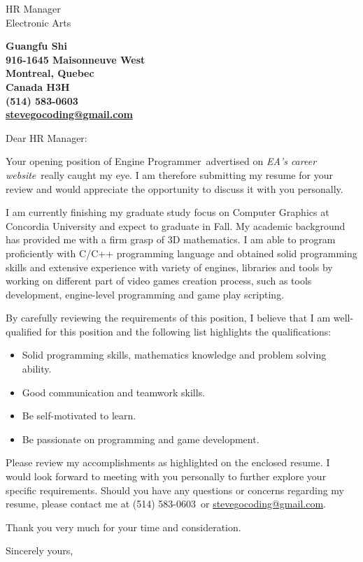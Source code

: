 \documentclass{letter}
\makeatletter
\newcommand{\phcompanyname}             {Electronic Arts}
\newcommand{\clcontactname}         {HR Manager}
\newcommand{\clcompanyname}         {\phcompanyname}
\newcommand{\cljobpostedtitle}      {Engine Programmer}
\newcommand{\cljobpostedplace}      {EA's career website}
\newcommand{\clmyname}              {Guangfu Shi}
\newcommand{\clmyaddr}              {916-1645 Maisonneuve West \\ Montreal, Quebec \\ Canada H3H }
\newcommand{\clmyemail}             {\href{mailto:stevegocoding@gmail.com}{stevegocoding@gmail.com}}
\newcommand{\clmyphone}             {(514) 583-0603}
\makeatother
\begin{document}
\begin{letter}{\clcontactname \\ \clcompanyname}

\begin{center}
    \large\bf\clmyname              \\ 
    \clmyaddr                       \\
    \clmyphone                      \\ 
    \clmyemail                      
\end{center}

\vfill %

\opening{Dear \clcontactname:}

Your opening position of \cljobpostedtitle\ advertised on \emph{\cljobpostedplace}\ really caught my eye. I am therefore submitting my resume for your review and would appreciate the opportunity to discuss it with you personally.

I am currently finishing my graduate study focus on Computer Graphics at Concordia University and expect to graduate in Fall. My academic background has provided me with a firm grasp of 3D mathematics. I am able to program proficiently with C/C++ programming language and obtained solid programming skills and extensive experience with variety of engines, libraries and tools by working on different part of video games creation process, such as tools development, engine-level programming and game play scripting.

By carefully reviewing the requirements of this position, I believe that I am well-qualified for this position and the following list highlights the qualifications:

\begin{itemize}
        \item Solid programming skills, mathematics knowledge and problem solving ability.
        \item Good communication and teamwork skills.
        \item Be self-motivated to learn.
        \item Be passionate on programming and game development.
\end{itemize}

Please review my accomplishments as highlighted on the enclosed resume. I would look forward to meeting with you personally to further explore your specific requirements. Should you have any questions or concerns regarding my resume, please contact me at \clmyphone\ or \clmyemail.

Thank you very much for your time and consideration. 

\closing{Sincerely yours,}
\end{letter}
\end{document}
